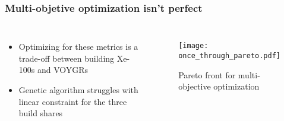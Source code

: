 \begin{frame}
    \frametitle{Multi-objetive optimization isn't perfect}
    \begin{columns}
        \column[t]{5cm}
        \begin{itemize}
            \item Optimizing for these metrics is a trade-off between 
                 building Xe-100s and VOYGRs
            \item Genetic algorithm struggles with linear constraint for 
                  the three build shares
        \end{itemize}

        \column[t]{5cm}
        \begin{figure}
            \centering 
            \texttt{[image: once\_through\_pareto.pdf]}
            \caption{Pareto front for multi-objective optimization}
            \label{fig:pareto}
        \end{figure}
    \end{columns}
    
\end{frame}